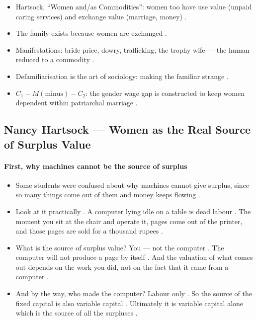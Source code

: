 \begin{QuickRevision}
\begin{itemize}
    \item Hartsock, ``Women and/as Commodities'': women too have use value (unpaid caring services) and exchange value (marriage, money) .
    \item The family exists because women are exchanged .
    \item Manifestations: bride price, dowry, trafficking, the trophy wife --- the human reduced to a commodity .
    \item Defamiliarisation is the art of sociology: making the familiar strange .
    \item $C_1-M(\text{minus})-C_2$: the gender wage gap is constructed to keep women dependent within patriarchal marriage .
\end{itemize}
\end{QuickRevision}

\subsection{Nancy Hartsock --- Women as the Real Source of Surplus Value}

\paragraph{First, why machines cannot be the source of surplus}
\begin{itemize}
    \item Some students were confused about why machines cannot give surplus, since so many things come out of them and money keeps flowing .
    \item Look at it practically . A computer lying idle on a table is dead labour . The moment you sit at the chair and operate it, pages come out of the printer, and those pages are sold for a thousand rupees .
    \item What is the source of surplus value? You --- not the computer . The computer will not produce a page by itself . And the valuation of what comes out depends on the work you did, not on the fact that it came from a computer .
    \item And by the way, who made the computer? Labour only . So the source of the fixed capital is also variable capital . Ultimately it is variable capital alone which is the source of all the surpluses .
\end{itemize}

